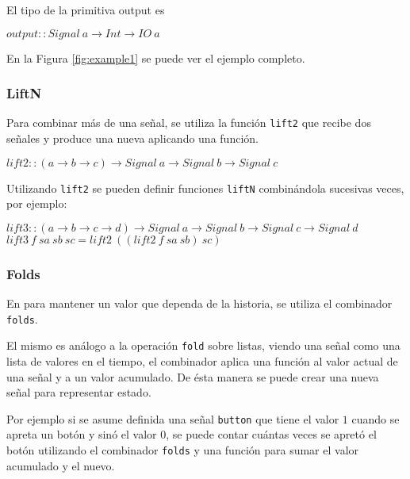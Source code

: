   El tipo de la primitiva output es

\begin{center}
$output :: Signal\ a \rightarrow Int \rightarrow IO\ a$
\end{center}
 
  En la Figura \ref{fig:example1} se puede ver el ejemplo completo.



\subsubsection{LiftN}

  Para combinar más de una señal, se utiliza la función \texttt{lift2}
que recibe dos señales y produce una nueva aplicando una función.

\begin{center}
$lift2 :: (a \rightarrow b \rightarrow c) \rightarrow Signal\ a \rightarrow Signal\ b \rightarrow Signal\ c$
\end{center}

  Utilizando \texttt{lift2} se pueden definir funciones \texttt{liftN}
combinándola sucesivas veces, por ejemplo:

\begin{center}
$lift3 :: (a \rightarrow b \rightarrow c \rightarrow d) \rightarrow Signal\ a \rightarrow Signal\ b \rightarrow Signal\ c \rightarrow Signal\ d$
$lift3\ f\ sa\ sb\ sc = lift2\ ((lift2\ f\ sa\ sb)\ sc)$
\end{center}

\subsubsection{Folds}

  En \frob{} para mantener un valor que dependa de la historia, se utiliza
el combinador \texttt{folds}.

  El mismo es análogo a la operación \texttt{fold} sobre listas, viendo
una señal como una lista de valores en el tiempo, el combinador aplica una
función al valor actual de una señal y a un valor acumulado.
  De ésta manera se puede crear una nueva señal para representar estado.

  Por ejemplo si se asume definida una señal \texttt{button} que tiene
el valor $1$ cuando se apreta un botón y sinó el valor $0$, se puede
contar cuántas veces se apretó el botón utilizando el combinador \texttt{folds}
y una función para sumar el valor acumulado y el nuevo.

